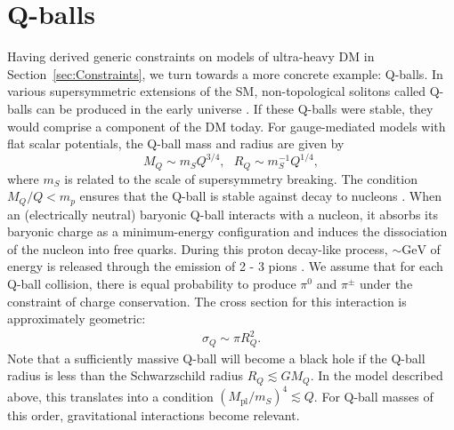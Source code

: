 \documentclass[twocolumn,showpacs,preprintnumbers,amsmath,amssymb,prd]{revtex4}
\begin{document}
\section{Q-balls}
\label{sec:QBalls}

Having derived generic constraints on models of ultra-heavy DM in Section~\ref{sec:Constraints}, we turn towards a more concrete example: Q-balls.
In various supersymmetric extensions of the SM, non-topological solitons called Q-balls can be produced in the early universe \cite{Coleman:1985ki, Kusenko:1997si}.
If these Q-balls were stable, they would comprise a component of the DM today.
For gauge-mediated models with flat scalar potentials, the Q-ball mass and radius are given by
\begin{equation}
\label{eq:Qballprop}
M_Q \sim m_S Q^{3/4}, ~~~ R_Q \sim m_S^{-1} Q^{1/4},
\end{equation}
where $m_S$ is related to the scale of supersymmetry breaking.
The condition $M_Q/Q < m_p$ ensures that the Q-ball is stable against decay to nucleons \cite{Dine:2003ax}.
When an (electrically neutral) baryonic Q-ball interacts with a nucleon, it absorbs its baryonic charge as a minimum-energy configuration and induces the dissociation of the nucleon into free quarks.
During this proton decay-like process, $\sim \text{GeV}$ of energy is released through the emission of 2 - 3 pions \cite{Dine:2003ax}.
We assume that for each Q-ball collision, there is equal probability to produce $\pi^0$ and $\pi^\pm$ under the constraint of charge conservation.
The cross section for this interaction is approximately geometric:
\begin{align}
\sigma_Q \sim \pi R_Q^2.
\end{align}
Note that a sufficiently massive Q-ball will become a black hole if the Q-ball radius is less than the Schwarzschild radius $R_Q \lesssim G M_Q$.
In the model described above, this translates into a condition $(M_\text{pl}/m_S)^4 \lesssim Q$.
For Q-ball masses of this order, gravitational interactions become relevant.
\end{document}
